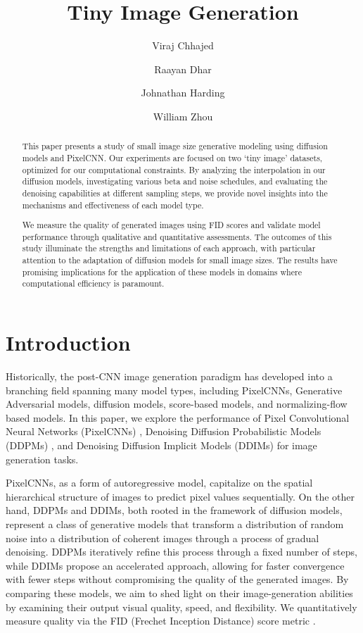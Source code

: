 \documentclass[10pt,twocolumn,letterpaper]{article}
\begin{document}
\title{Tiny Image Generation}

\author{Viraj Chhajed\\
\and
Raayan Dhar
\and
Johnathan Harding
\and
William Zhou
}
\maketitle

\begin{abstract}
This paper presents a study of small image size generative modeling using diffusion models and PixelCNN. Our experiments are focused on two `tiny image' datasets, optimized for our computational constraints. By analyzing the interpolation in our diffusion models, investigating various beta and noise schedules, and evaluating the denoising capabilities at different sampling steps, we provide novel insights into the mechanisms and effectiveness of each model type.

We measure the quality of generated images using FID scores and validate model performance through qualitative and quantitative assessments. The outcomes of this study illuminate the strengths and limitations of each approach, with particular attention to the adaptation of diffusion models for small image sizes. The results have promising implications for the application of these models in domains where computational efficiency is paramount.
\end{abstract}

\section{Introduction}
\label{sec:intro}

Historically, the post-CNN image generation paradigm has developed into a branching field spanning many model types, including PixelCNNs, Generative Adversarial models, diffusion models, score-based models, and normalizing-flow based models. In this paper, we explore the performance of Pixel Convolutional Neural Networks (PixelCNNs) \cite{PixelCNN}, Denoising Diffusion Probabilistic Models (DDPMs) \cite{DDPM}, and Denoising Diffusion Implicit Models (DDIMs) \cite{DDIM} for image generation tasks. 

\hfill

PixelCNNs, as a form of autoregressive model, capitalize on the spatial hierarchical structure of images to predict pixel values sequentially. On the other hand, DDPMs and DDIMs, both rooted in the framework of diffusion models, represent a class of generative models that transform a distribution of random noise into a distribution of coherent images through a process of gradual denoising. DDPMs iteratively refine this process through a fixed number of steps, while DDIMs propose an accelerated approach, allowing for faster convergence with fewer steps without compromising the quality of the generated images. By comparing these models, we aim to shed light on their image-generation abilities by examining their output visual quality, speed, and flexibility. We quantitatively measure quality via the FID (Frechet Inception Distance) score metric \cite{FID}.
\end{document}
